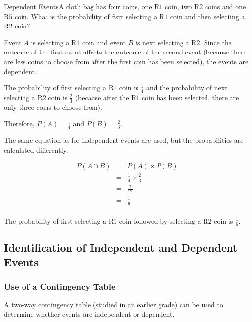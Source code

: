 \begin{wex}{Dependent Events}{A cloth bag has four coins, one R$1$ coin, two R$2$ coins and one R$5$ coin. What is the probability of fisrt selecting a R$1$ coin and then selecting a R$2$ coin?\\}{

Event $A$ is selecting a R$1$ coin and event $B$ is next selecting a R$2$. Since the outcome of the first event affects the outcome of the second event (because there are less coins to choose from after the first coin has been selected), the events are dependent.\\


The probability of first selecting a R$1$ coin is $\frac{1}{4}$ and the probability of next selecting a R$2$ coin is $\frac{2}{3}$ (because after the R$1$ coin has been selected, there are only three coins to choose from).

Therefore, $P(A)=\frac{1}{4}$ and $P(B)=\frac{2}{3}$.\\


The same equation as for independent events are used, but the probabilities are calculated differently.

\begin{eqnarray*}
P(A \cap B) &=& P(A)\times P(B)\\
&=&\frac{1}{4} \times \frac{2}{3}\\
&=&\frac{2}{12}\\
&=&\frac{1}{6}\\
\end{eqnarray*}

The probability of first selecting a R$1$ coin followed by selecting a R$2$ coin is $\frac{1}{6}$.}
\end{wex}

\subsection{Identification of Independent and Dependent Events}
\subsubsection{Use of a Contingency Table}
A two-way contingency table (studied in an earlier grade) can be used to determine whether events are independent or dependent.

